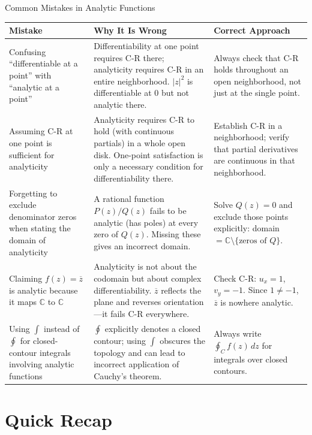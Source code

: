 \documentclass[12pt,a4paper]{article}
\begin{document}
\begin{mistakebox}{Common Mistakes in Analytic Functions}
\begin{center}
\begin{tabular}{p{5cm} p{5cm} p{5cm}}
\toprule
\textbf{Mistake} & \textbf{Why It Is Wrong} & \textbf{Correct Approach} \\
\midrule
Confusing ``differentiable at a point'' with ``analytic at a point'' &
Differentiability at one point requires C-R there; analyticity requires C-R in an entire neighborhood. $|z|^{2}$ is differentiable at 0 but not analytic there. &
Always check that C-R holds throughout an open neighborhood, not just at the single point. \\
\midrule
Assuming C-R at one point is sufficient for analyticity &
Analyticity requires C-R to hold (with continuous partials) in a whole open disk. One-point satisfaction is only a necessary condition for differentiability there. &
Establish C-R in a neighborhood; verify that partial derivatives are continuous in that neighborhood. \\
\midrule
Forgetting to exclude denominator zeros when stating the domain of analyticity &
A rational function $P(z)/Q(z)$ fails to be analytic (has poles) at every zero of $Q(z)$. Missing these gives an incorrect domain. &
Solve $Q(z) = 0$ and exclude those points explicitly: domain $= \mathbb{C} \setminus \{\text{zeros of } Q\}$. \\
\midrule
Claiming $f(z) = \overline{z}$ is analytic because it maps $\mathbb{C}$ to $\mathbb{C}$ &
Analyticity is not about the codomain but about complex differentiability. $\overline{z}$ reflects the plane and reverses orientation---it fails C-R everywhere. &
Check C-R: $u_x = 1$, $v_y = -1$. Since $1 \neq -1$, $\overline{z}$ is nowhere analytic. \\
\midrule
Using $\int$ instead of $\oint$ for closed-contour integrals involving analytic functions &
$\oint$ explicitly denotes a closed contour; using $\int$ obscures the topology and can lead to incorrect application of Cauchy's theorem. &
Always write $\oint_{C} f(z)\,dz$ for integrals over closed contours. \\
\bottomrule
\end{tabular}
\end{center}
\end{mistakebox}

\section{Quick Recap}
\end{document}
